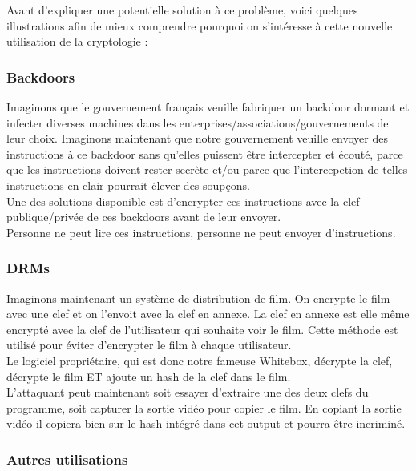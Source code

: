 \documentclass[a4paper,12pt]{article}
\begin{document}
Avant d'expliquer une potentielle solution à ce problème, voici quelques illustrations afin de mieux comprendre pourquoi on s'intéresse à cette nouvelle utilisation de la cryptologie :\\


\subsubsection{Backdoors}

Imaginons que le gouvernement français veuille fabriquer un backdoor dormant et infecter diverses machines dans les enterprises/associations/gouvernements de leur choix. Imaginons maintenant que notre gouvernement veuille envoyer des instructions à ce backdoor sans qu'elles puissent être intercepter et écouté, parce que les instructions doivent rester secrète et/ou parce que l'intercepetion de telles instructions en clair pourrait élever des soupçons.\\

Une des solutions disponible est d'encrypter ces instructions avec la clef publique/privée de ces backdoors avant de leur envoyer.\\

Personne ne peut lire ces instructions, personne ne peut envoyer d'instructions.

\subsubsection{DRMs}

Imaginons maintenant un système de distribution de film. On encrypte le film avec une clef et on l'envoit avec la clef en annexe. La clef en annexe est elle même encrypté avec la clef de l'utilisateur qui souhaite voir le film. Cette méthode est utilisé pour éviter d'encrypter le film à chaque utilisateur.\\
Le logiciel propriétaire, qui est donc notre fameuse Whitebox, décrypte la clef, décrypte le film ET ajoute un hash de la clef dans le film.\\
L'attaquant peut maintenant soit essayer d'extraire une des deux clefs du programme, soit capturer la sortie vidéo pour copier le film. En copiant la sortie vidéo il copiera bien sur le hash intégré dans cet output et pourra être incriminé.


\subsubsection{Autres utilisations}
\end{document}
